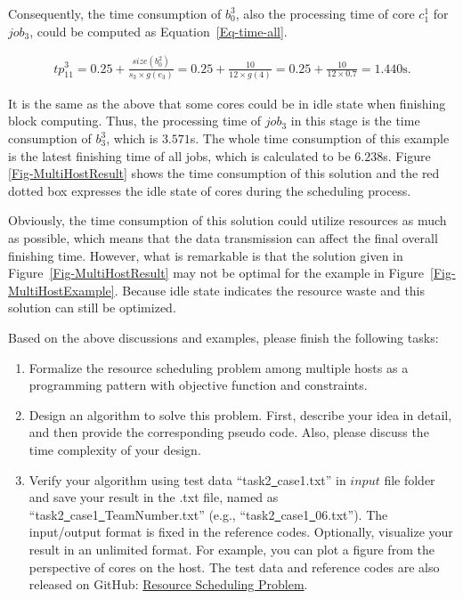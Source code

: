 \documentclass{llncs}
\begin{document}
Consequently, the time consumption of $b^3_0$, also the processing time of core $c^1_1$ for $job_3$, could be computed as Equation~\eqref{Eq-time-all}.

\begin{equation}
\begin{aligned}
{tp}^3_{11}=0.25+\frac{size(b^2_0)}{s_3\times{g(e_3)}}=0.25+\frac{10}{12\times{g(4)}}=0.25+\frac{10}{12\times0.7}=1.440\text{s}.
\label{Eq-time-all}
\end{aligned}
\end{equation}

It is the same as the above that some cores could be in idle state when finishing block computing. Thus, the processing time of $job_3$ in this stage is the time consumption of $b^3_3$, which is $3.571$s. The whole time consumption of this example is the latest finishing time of all jobs, which is calculated to be $6.238$s. Figure \ref{Fig-MultiHostResult} shows the time consumption of this solution and the red dotted box expresses the idle state of cores during the scheduling process.

Obviously, the time consumption of this solution could utilize resources as much as possible, which means that the data transmission can affect the final overall finishing time. However, what is remarkable is that the solution given in Figure~\ref{Fig-MultiHostResult} may not be optimal for the example in Figure~\ref{Fig-MultiHostExample}. Because idle state indicates the resource waste and this solution can still be optimized.

\vspace{2mm}
Based on the above discussions and examples, please finish the following tasks:
\begin{enumerate}
  \vspace{-1mm}
  \item Formalize the resource scheduling problem among multiple hosts as a programming pattern with objective function and constraints.
  \item Design an algorithm to solve this problem. First, describe your idea in detail, and then provide the corresponding pseudo code. Also, please discuss the time complexity of your design.
  \item Verify your algorithm using test data ``task2\underline\ case1.txt'' in $input$ file folder and save your result in the .txt file, named as ``task2\underline\ case1\underline\ TeamNumber.txt'' (e.g., ``task2\underline\ case1\underline\ 06.txt''). The input/output format is fixed in the reference codes. Optionally, visualize your result in an unlimited format. For example, you can plot a figure from the perspective of cores on the host. The test data and reference codes are also released on GitHub: \href{https://github.com/shiwanghua/SharedFiles/tree/Project-CodeDemo}{Resource Scheduling Problem}.
\end{enumerate}
\end{document}
